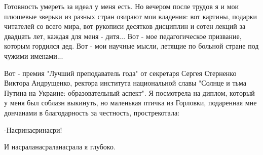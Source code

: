 
Готовность умереть за идеал у меня есть. Но вечером после трудов я и мои
плюшевые зверьки из разных стран озирают мои владения: вот картины, подарки
читателей со всего мира, вот рукописи десятков дисциплин и сотен лекций за
двадцать лет, каждая для меня - дитя... Вот - мое педагогическое призвание,
которым гордился дед. Вот - мои научные мысли, летящие по больной стране под
чужими именами...

Вот - премия "Лучший преподаватель года" от секретаря Сергея Стерненко Виктора
Андрущенко, ректора института национальной славы "Солнце и тьма Путина на
Украине: образовательный аспект". Я посмотрела на диплом, который у меня был
соблазн выкинуть, но маленькая птичка из Горловки, подаренная мне дончанами в
благодарность за честность, прострекотала:

-Насринасринасри!

И насраланасраланасрала я глубоко.

